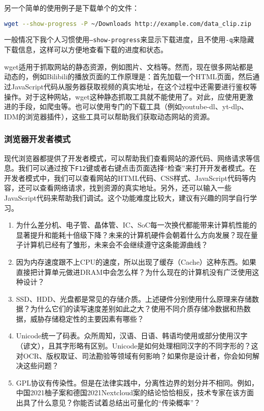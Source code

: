另一个简单的使用例子是下载单个的文件：
\begin{lstlisting}[language=bash]
  wget --show-progress -P ~/Downloads http://example.com/data_clip.zip
\end{lstlisting}
一般情况下我个人习惯使用\texttt{--show-progress}来显示下载进度，且不使用\texttt{-q}来隐藏下载信息，这样可以方便地查看下载的进度和状态。

wget适用于抓取网站的静态资源，例如图片、文档等。然而，现在很多网站都是动态的，例如Bilibili的播放页面的工作原理是：首先加载一个HTML页面，然后通过JavaScript代码从服务器获取视频的真实地址，在这个过程中还需要进行鉴权等操作。对于这种网站，wget这种静态抓取工具就不能使用了。对此，应使用更激进的手段，如爬虫等。也可以使用专门的下载工具（例如youtube-dl、yt-dlp、IDM的浏览器插件），这些工具可以帮助我们获取动态网站的资源。

\subsubsection{浏览器开发者模式}

现代浏览器都提供了开发者模式，可以帮助我们查看网站的源代码、网络请求等信息。我们可以通过按下\texttt{F12}键或者右键点击页面选择“检查”来打开开发者模式。在开发者模式中，我们可以查看网站的HTML代码、CSS样式、JavaScript代码等内容，还可以查看网络请求，找到资源的真实地址。另外，还可以输入一些JavaScript代码来帮助我们调试。这个功能难度比较大，建议有兴趣的同学自行学习。

\begin{thinking}
\begin{enumerate}
  \item 为什么差分机、电子管、晶体管、IC、SoC每一次换代都能带来计算机性能的显著提升和能耗十倍级下降？未来的计算机硬件会朝着什么方向发展？现在量子计算机已经有了雏形，未来会不会继续遵守这条能源曲线？
  \item 因为内存速度跟不上CPU的速度，所以出现了缓存（Cache）这种东西。如果直接把计算单元做进DRAM中会怎么样？为什么现在的计算机没有广泛使用这种设计？
  \item SSD、HDD、光盘都是常见的存储介质。上述硬件分别使用什么原理来存储数据？为什么它们的读写速度差别如此之大？使用不同介质存储冷数据和热数据，威胁存储稳定性的主要因素有哪些？
  \item Unicode统一了码表。众所周知，汉语、日语、韩语均使用或部分使用汉字（谚文），且其字形略有区别。Unicode是如何处理相同汉字的不同字形的？这对OCR、版权取证、司法勘验等领域有何影响？如果你是设计者，你会如何解决这些问题？
  \item GPL协议有传染性。但是在法律实践中，分离性边界的划分并不相同。例如，中国2021柚子案和德国2021Nextcloud案的结论恰恰相反，技术专家在该方面出具了什么意见？你能否试着总结出可量化的“传染概率”？
\end{enumerate}
\end{thinking}